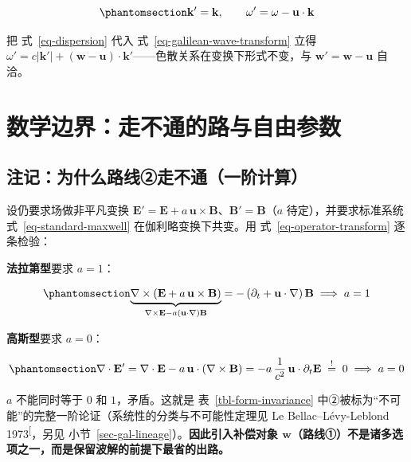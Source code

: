 \documentclass[
  chinese,
  a4paper,
  UTF8,
  12pt,
  oneside,
  openany]{ctexbook}
\theoremstyle{plain}
\theoremstyle{plain}
\theoremstyle{plain}
\theoremstyle{definition}
\theoremstyle{plain}
\theoremstyle{plain}
\theoremstyle{remark}
\begin{document}
\begin{equation}\protect\phantomsection\label{eq-galilean-wave-transform}{
\mathbf{k}' = \mathbf{k},
\qquad
\omega' = \omega - \mathbf{u}\cdot\mathbf{k}
}\end{equation}

把 式~\ref{eq-dispersion} 代入 式~\ref{eq-galilean-wave-transform} 立得
\(\omega' = c|\mathbf{k}'| + (\mathbf{w}-\mathbf{u})\cdot\mathbf{k}'\)------色散关系在变换下形式不变，与
\(\mathbf{w}'=\mathbf{w}-\mathbf{u}\) 自洽。

\section{数学边界：走不通的路与自由参数}\label{sec-gal-boundary}

\subsection{注记：为什么路线②走不通（一阶计算）}\label{ux6ce8ux8bb0ux4e3aux4ec0ux4e48ux8defux7ebfux2461ux8d70ux4e0dux901aux4e00ux9636ux8ba1ux7b97}

设仍要求场做非平凡变换
\(\mathbf{E}' = \mathbf{E} + a\,\mathbf{u}\times\mathbf{B}\)、\(\mathbf{B}'=\mathbf{B}\)（\(a\)
待定），并要求标准系统 式~\ref{eq-standard-maxwell}
在伽利略变换下共变。用 式~\ref{eq-operator-transform} 逐条检验：

\textbf{法拉第型}要求 \(a=1\)：

\begin{equation}\protect\phantomsection\label{eq-nogo-faraday}{
\underbrace{\nabla\times\left(\mathbf{E}+a\,\mathbf{u}\times\mathbf{B}\right)}_{\nabla\times\mathbf{E}-a\left(\mathbf{u}\cdot\nabla\right)\mathbf{B}}
= -\left(\partial_{t}+\mathbf{u}\cdot\nabla\right)\mathbf{B}
\;\Longrightarrow\; a = 1
}\end{equation}

\textbf{高斯型}要求 \(a=0\)：

\begin{equation}\protect\phantomsection\label{eq-nogo-gauss}{
\nabla\cdot\mathbf{E}' = \nabla\cdot\mathbf{E} - a\,\mathbf{u}\cdot\left(\nabla\times\mathbf{B}\right)
= -a\,\frac{1}{c^{2}}\,\mathbf{u}\cdot\partial_{t}\mathbf{E}
\;\overset{!}{=}\; 0
\;\Longrightarrow\; a = 0
}\end{equation}

\(a\) 不能同时等于 \(0\) 和 \(1\)，矛盾。这就是
表~\ref{tbl-form-invariance}
中②被标为``不可能''的完整一阶论证（系统性的分类与不可能性定理见 Le
Bellac--Lévy-Leblond
1973\textsuperscript{{[}\citeproc{ref-lebellac1973}{8}{]}}，另见
小节~\ref{sec-gal-lineage}）。\textbf{因此引入补偿对象
\(\mathbf{w}\)（路线①）不是诸多选项之一，而是保留波解的前提下最省的出路。}
\end{document}
